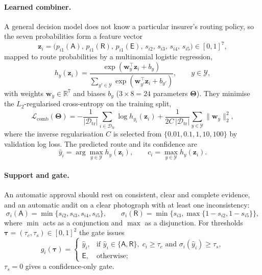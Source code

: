 \paragraph{Learned combiner.}
A general decision model does not know a particular insurer's routing policy, so the seven probabilities form a feature vector
\begin{equation}
\mathbf{z}_i=\big(p_{i1}(\mathsf{A}),\,p_{i1}(\mathsf{R}),\,p_{i1}(\mathsf{E}),\,s_{i2},\,s_{i3},\,s_{i4},\,s_{i5}\big)\in[0,1]^{7}, \label{eq:features}
\end{equation}
mapped to route probabilities by a multinomial logistic regression,
\begin{equation}
h_y(\mathbf{z}_i)=\frac{\exp(\mathbf{w}_y^{\top}\mathbf{z}_i+b_y)}{\sum_{y'\in\mathcal{Y}}\exp(\mathbf{w}_{y'}^{\top}\mathbf{z}_i+b_{y'})},\qquad y\in\mathcal{Y}, \label{eq:combiner}
\end{equation}
with weights $\mathbf{w}_y\in\mathbb{R}^{7}$ and biases $b_y$ ($3\times8=24$ parameters $\boldsymbol{\Theta}$). They minimise the $L_2$-regularised cross-entropy on the training split,
\begin{equation}
\mathcal{L}_{\mathrm{comb}}(\boldsymbol{\Theta})=-\frac{1}{|\mathcal{D}_{\mathrm{tr}}|}\sum_{i\in\mathcal{D}_{\mathrm{tr}}}\log h_{y_i}(\mathbf{z}_i)+\frac{1}{2C\,|\mathcal{D}_{\mathrm{tr}}|}\sum_{y\in\mathcal{Y}}\lVert\mathbf{w}_y\rVert_2^2, \label{eq:combloss}
\end{equation}
where the inverse regularisation $C$ is selected from $\{0.01,0.1,1,10,100\}$ by validation log loss. The predicted route and its confidence are
\begin{equation}
\hat{y}_i=\arg\max_{y\in\mathcal{Y}}h_y(\mathbf{z}_i),\qquad c_i=\max_{y\in\mathcal{Y}}h_y(\mathbf{z}_i). \label{eq:route}
\end{equation}

\paragraph{Support and gate.}
An automatic approval should rest on consistent, clear and complete evidence, and an automatic audit on a clear photograph with at least one inconsistency:
\begin{equation}
\sigma_i(\mathsf{A})=\min\{s_{i2},s_{i3},s_{i4},s_{i5}\},\qquad \sigma_i(\mathsf{R})=\min\big\{s_{i3},\max\{1-s_{i2},1-s_{i5}\}\big\}, \label{eq:support}
\end{equation}
where $\min$ acts as a conjunction and $\max$ as a disjunction. For thresholds $\boldsymbol{\tau}=(\tau_c,\tau_s)\in[0,1]^2$ the gate issues
\begin{equation}
g_i(\boldsymbol{\tau})=
\begin{cases}
\hat{y}_i, & \text{if } \hat{y}_i\in\{\mathsf{A},\mathsf{R}\},\; c_i\ge\tau_c \text{ and } \sigma_i(\hat{y}_i)\ge\tau_s,\\
\mathsf{E}, & \text{otherwise;}
\end{cases} \label{eq:gate}
\end{equation}
$\tau_s=0$ gives a confidence-only gate.

